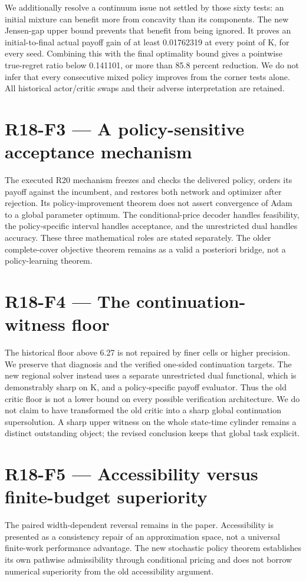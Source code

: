 \documentclass[ecta]{econsocart}
\theoremstyle{remark}
\begin{document}
We additionally resolve a continuum issue not settled by those sixty tests: an initial mixture can benefit more from concavity than its components. The new Jensen-gap upper bound prevents that benefit from being ignored. It proves an initial-to-final actual payoff gain of at least 0.01762319 at every point of K, for every seed. Combining this with the final optimality bound gives a pointwise true-regret ratio below 0.141101, or more than 85.8 percent reduction. We do not infer that every consecutive mixed policy improves from the corner tests alone. All historical actor/critic swaps and their adverse interpretation are retained.

\section{R18-F3 — A policy-sensitive acceptance mechanism}
The executed R20 mechanism freezes and checks the delivered policy, orders its payoff against the incumbent, and restores both network and optimizer after rejection. Its policy-improvement theorem does not assert convergence of Adam to a global parameter optimum. The conditional-price decoder handles feasibility, the policy-specific interval handles acceptance, and the unrestricted dual handles accuracy. These three mathematical roles are stated separately. The older complete-cover objective theorem remains as a valid a posteriori bridge, not a policy-learning theorem.

\section{R18-F4 — The continuation-witness floor}
The historical floor above 6.27 is not repaired by finer cells or higher precision. We preserve that diagnosis and the verified one-sided continuation targets. The new regional solver instead uses a separate unrestricted dual functional, which is demonstrably sharp on K, and a policy-specific payoff evaluator. Thus the old critic floor is not a lower bound on every possible verification architecture. We do not claim to have transformed the old critic into a sharp global continuation supersolution. A sharp upper witness on the whole state-time cylinder remains a distinct outstanding object; the revised conclusion keeps that global task explicit.

\section{R18-F5 — Accessibility versus finite-budget superiority}
The paired width-dependent reversal remains in the paper. Accessibility is presented as a consistency repair of an approximation space, not a universal finite-work performance advantage. The new stochastic policy theorem establishes its own pathwise admissibility through conditional pricing and does not borrow numerical superiority from the old accessibility argument.
\end{document}
